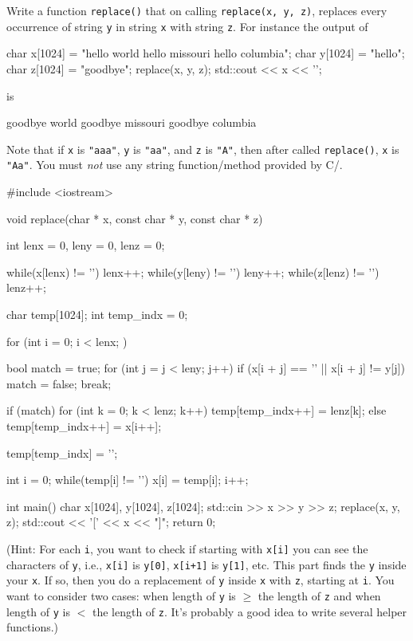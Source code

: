 

\nextq
Write a function \verb!replace()! that
on calling \verb!replace(x, y, z)!,
replaces every occurrence
of string \verb!y! in string \verb!x! with string \verb!z!.
For instance the output of
\begin{console}[fontsize=\small]
char x[1024] = "hello world hello missouri hello columbia";
char y[1024] = "hello";
char z[1024] = "goodbye";
replace(x, y, z);
std::cout << x << '\n';
\end{console}
is
\begin{console}[fontsize=\small]
goodbye world goodbye missouri goodbye columbia
\end{console}
Note that if \verb!x! is \verb!"aaa"!, \verb!y! is \verb!"aa"!,
and \verb!z! is \verb!"A"!, then after called \verb!replace()!,
\verb!x! is \verb!"Aa"!.
You must \textit{not} use any string function/method provided by C/\cpp.
\\
\ANSWER
\begin{answercode}
#include <iostream>

void replace(char * x, const char * y, const char * z)
{
  int lenx = 0, leny = 0, lenz = 0;

  while(x[lenx) != '\0') lenx++;
  while(y[leny) != '\0') leny++;
  while(z[lenz) != '\0') lenz++;

  char temp[1024];
  int temp_indx = 0;
  
  for (int i = 0; i < lenx; )
  {
    bool match = true;
    for (int j = j < leny; j++)
    {
      if (x[i + j] == '\0' || x[i + j] != y[j])
      {
        match = false;
        break;
      }
    }

    if (match)
    {
      for (int k = 0; k < lenz; k++)
      {
        temp[temp_indx++] = lenz[k];
      }
    }
    else
    {
      temp[temp_indx++] = x[i++];
    }
  }
  temp[temp_indx] = '\0';

  int i = 0;
  while(temp[i] != '\0')
  {
    x[i] = temp[i];
    i++;
  }
        
}

int main()
{
    char x[1024], y[1024], z[1024];
    std::cin >> x >> y >> z;
    replace(x, y, z);
    std::cout << '[' << x << "]\n";
    return 0;
}
\end{answercode}

(Hint: For each \verb!i!, you want to check if starting with \verb!x[i]!
you can see the characters of \verb!y!, i.e.,
\verb!x[i]! is \verb!y[0]!,
\verb!x[i+1]! is \verb!y[1]!,
etc.
This part finds the \verb!y! inside your \verb!x!.
If so, then you do a replacement of \verb!y! inside \verb!x! with \verb!z!,
starting at \verb!i!.
You want to consider two cases:
when length of \verb!y! is $\geq$ the length of \verb!z!
and
when length of \verb!y! is $<$ the
length of \verb!z!.
It's probably a good idea to write several helper functions.)


